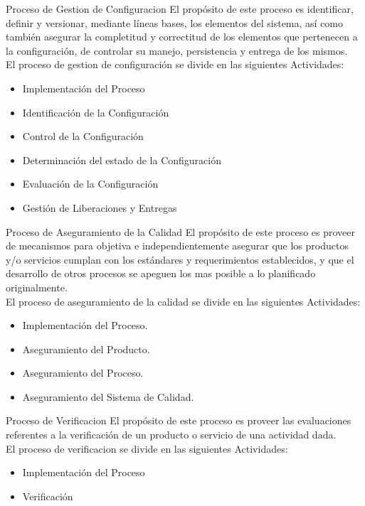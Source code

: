 \documentclass{beamer}
\begin{document}
			\begin{frame}{Proceso de Gestion de Configuracion}
				El propósito de este proceso es identificar, definir y versionar, mediante líneas bases, los elementos del sistema, así como también asegurar la completitud y correctitud de los elementos que pertenecen a la configuración, de controlar su manejo, persistencia y entrega de los mismos.\\
				
				El proceso de gestion de configuración se divide en las siguientes Actividades:\pause
					\begin{itemize}
						\item Implementación del Proceso\pause
						\item Identificación de la Configuración\pause
						\item Control de la Configuración\pause
						\item Determinación del estado de la Configuración\pause
						\item Evaluación de la Configuración\pause
						\item Gestión de Liberaciones y Entregas
					\end{itemize}			
			\end{frame}
			
			\begin{frame}{Proceso de Aseguramiento de la Calidad}
				El propósito de este proceso es proveer de mecanismos para objetiva e independientemente asegurar que los productos y/o servicios cumplan con los estándares y requerimientos establecidos, y que el desarrollo de otros procesos se apeguen los mas posible a lo planificado originalmente.\\
				
				El proceso de aseguramiento de la calidad se divide en las siguientes Actividades:\pause
					\begin{itemize}
						\item Implementación del Proceso.\pause
						\item Aseguramiento del Producto.\pause
						\item Aseguramiento del Proceso.\pause
						\item Aseguramiento del Sistema de Calidad.
					\end{itemize}
			\end{frame}
			
			\begin{frame}{Proceso de Verificacion}
				El propósito de este proceso es proveer las evaluaciones referentes a la verificación de un producto o servicio de una actividad dada.\\
				
				El proceso de verificacion se divide en las siguientes Actividades:	\pause				
					\begin{itemize}
						\item Implementación del Proceso\pause
						\item Verificación
					\end{itemize}
			\end{frame}
			
\end{document}

